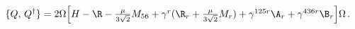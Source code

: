 \begin{equation}
{}\{Q,\,Q^{\dagger}\}=2\Omega\Big[H-\R-\textstyle{\frac{\mu}{3\sqrt{2}}} M_{56}+\gamma^{r}(\R_{r}+\textstyle{\frac{\mu}{3\sqrt{2}}} M_{r})
+\gamma^{125r}\A_{r}+\gamma^{436r}\B_{r}\Big]\Omega\,.\label{susyalge}
\end{equation}

